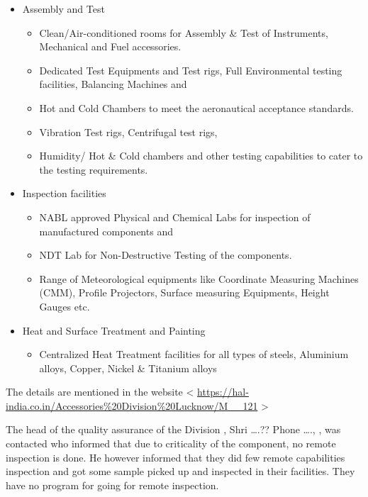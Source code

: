 \documentclass[
]{article}
\providecommand{\tightlist}{%
  \setlength{\itemsep}{0pt}\setlength{\parskip}{0pt}}
\begin{document}
\begin{itemize}
\tightlist
\item
  Assembly and Test

  \begin{itemize}
  \tightlist
  \item
    Clean/Air-conditioned rooms for Assembly \& Test of Instruments,
    Mechanical and Fuel accessories.
  \item
    Dedicated Test Equipments and Test rigs, Full Environmental testing
    facilities, Balancing Machines and
  \item
    Hot and Cold Chambers to meet the aeronautical acceptance standards.
  \item
    Vibration Test rigs, Centrifugal test rigs,
  \item
    Humidity/ Hot \& Cold chambers and other testing capabilities to
    cater to the testing requirements.
  \end{itemize}
\item
  Inspection facilities

  \begin{itemize}
  \tightlist
  \item
    NABL approved Physical and Chemical Labs for inspection of
    manufactured components and
  \item
    NDT Lab for Non-Destructive Testing of the components.
  \item
    Range of Meteorological equipments like Coordinate Measuring
    Machines (CMM), Profile Projectors, Surface measuring Equipments,
    Height Gauges etc.
  \end{itemize}
\item
  Heat and Surface Treatment and Painting

  \begin{itemize}
  \tightlist
  \item
    Centralized Heat Treatment facilities for all types of steels,
    Aluminium alloys, Copper, Nickel \& Titanium alloys
  \end{itemize}
\end{itemize}

The details are mentioned in the website \textless{}
\url{https://hal-india.co.in/Accessories\%20Division\%20Lucknow/M__121}
\textgreater{}

The head of the quality assurance of the Division , Shri \ldots.?? Phone
\ldots., , was contacted who informed that due to criticality of the
component, no remote inspection is done. He however informed that they
did few remote capabilities inspection and got some sample picked up and
inspected in their facilities. They have no program for going for remote
inspection.
\end{document}
